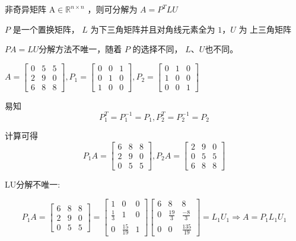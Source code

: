\begin{theorem}
    非奇异矩阵 $ \mathrm{A} \in \mathbb{R}^{n \times n} $ ，则可分解为 $ A=P^{T} L U $

    $ P $ 是一个置换矩阵， $ L $ 为下三角矩阵并且对角线元素全为 $ 1 ， U $ 为 上三角矩阵
\end{theorem}


$PA=LU$分解方法不唯一，随着 $ P $ 的选择不同， $L$、$U$也不同。

\begin{example}[$PA=LU$]


    $ A=\left[\begin{array}{lll}0 & 5 & 5 \\ 2 & 9 & 0 \\ 6 & 8 & 8\end{array}\right], P_{1}=\left[\begin{array}{lll}0 & 0 & 1 \\ 0 & 1 & 0 \\ 1 & 0 & 0\end{array}\right], P_{2}=\left[\begin{array}{lll}0 & 1 & 0 \\ 1 & 0 & 0 \\ 0 & 0 & 1\end{array}\right] $

    易知
    $$P_{1}^{T}=P_{1}^{-1}=P_{1}, P_{2}^{T}=P_{2}^{-1}=P_{2}$$

    计算可得
    $$ P_{1} A=\left[\begin{array}{lll}6 & 8 & 8 \\ 2 & 9 & 0 \\ 0 & 5 & 5\end{array}\right], P_{2} A=\left[\begin{array}{lll}2 & 9 & 0 \\ 0 & 5 & 5 \\ 6 & 8 & 8\end{array}\right] $$

    LU分解不唯一:

    $$
        P_{1} A=\left[\begin{array}{lll}
                6 & 8 & 8 \\
                2 & 9 & 0 \\
                0 & 5 & 5
            \end{array}\right]=\left[\begin{array}{ccc}
                1           & 0             & 0 \\
                \frac{1}{3} & 1             & 0 \\
                0           & \frac{15}{19} & 1
            \end{array}\right]\left[\begin{array}{ccc}
                6 & 8            & 8              \\
                0 & \frac{19}{3} & \frac{-8}{3}   \\
                0 & 0            & \frac{135}{19}
            \end{array}\right]=L_{1} U_{1} \Rightarrow A=P_{1} L_{1} U_{1}
    $$



\end{example}
